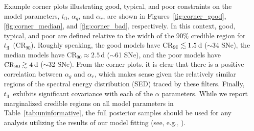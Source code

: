 \documentclass[twocolumn]{./aastex63}
\newcommand{\tfl}{$t_\mathrm{fl}$}
\begin{document}
Example corner plots illustrating good, typical, and poor constraints on the
model parameters, \tfl, $\alpha_g$, and $\alpha_r$, are shown in
Figures~\ref{fig:corner_good}, \ref{fig:corner_median}, and
\ref{fig:corner_bad}, respectively. In this context, good, typical, and poor
are defined relative to the width of the 90\% credible region for \tfl\
($\mathrm{CR}_{90}$). Roughly speaking, the good models have $\mathrm{CR}_{90}
\lesssim 1.5$\,d ($\sim$34 SNe), the median models have $\mathrm{CR}_{90} \approx
2.5$\,d ($\sim$61 SNe), and the poor models have $\mathrm{CR}_{90} \gtrsim 4$\,d
($\sim$32 SNe). From the corner plots. it is clear that there is a positive
correlation between $\alpha_g$ and $\alpha_r$, which makes sense given the
relatively similar regions of the spectral energy distribution (SED) traced by
these filters. Finally, \tfl\ exhibits significant covariance with each of the
$\alpha$ parameters. While we report marginalized credible regions on all
model parameters in Table~\ref{tab:uninformative}, the full posterior samples
should be used for any analysis utilizing the results of our model fitting
(see, e.g., \citealt{Bulla20}).
\end{document}
